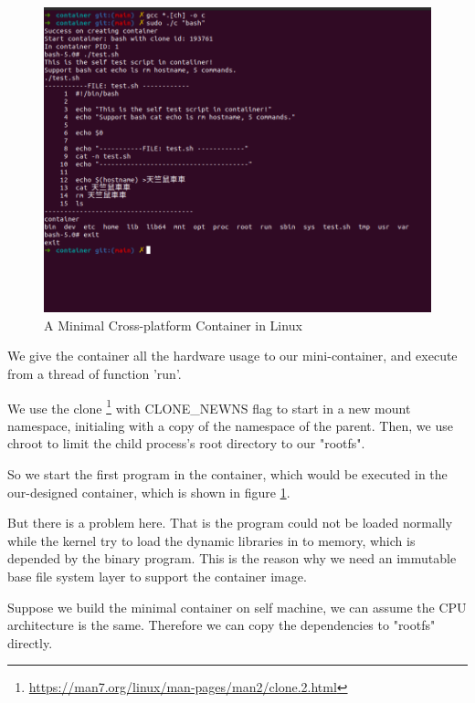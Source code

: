 {
\begin{figure}
    \centering
    \includegraphics[width=.89\textwidth]{src/cur_cont.png}
    \caption{A Minimal Cross-platform Container in Linux}
    \label{lc}
\end{figure}
}

We give the container all the hardware usage to our mini-container, and execute from a thread of
function 'run'.

We use the clone \footnote{\url{https://man7.org/linux/man-pages/man2/clone.2.html}} with
CLONE\_NEWNS flag to start in a new mount namespace, initialing with a copy of the
namespace of the parent. Then, we use chroot to limit the child process's root directory
to our "rootfs".

So we start the first program in the container, which would be executed in the
our-designed container, which is shown in figure \ref{lc}.


But there is a problem here. That is the program could not be loaded normally while
the kernel try to load the dynamic libraries in to memory, which is depended by the
binary program. This is the reason why we need an immutable base file system layer to
support the container image.

Suppose we build the minimal container on self machine, we can assume the CPU architecture
is the same. Therefore we can copy the dependencies to "rootfs" directly.



